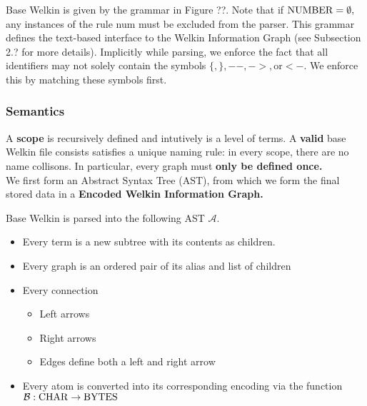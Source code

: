 Base Welkin is given by the grammar in Figure ??. Note that if $\mathrm{NUMBER}= \emptyset,$ any instances of the rule num must be excluded from the parser. This grammar defines the text-based interface to the Welkin Information Graph (see Subsection 2.? for more details). Implicitly while parsing, we enforce the fact that all identifiers may not solely contain the symbols $\{, \}, --, ->, \text{or} <-.$ We enforce this by matching these symbols first.

\subsubsection*{Semantics}
A \textbf{scope} is recursively defined and intutively is a level of terms. A \textbf{valid} base Welkin file consists satisfies a unique naming rule: in every scope, there are no name collisons. In particular, every graph must \textbf{only be defined once.}
\\ We first form an Abstract Syntax Tree (AST), from which we form the final stored data in a \textbf{Encoded Welkin Information Graph.}
\begin{definition}
  Base Welkin is parsed into the following AST $\mathcal{A}.$
  \begin{itemize}
	\item Every term is a new subtree with its contents as children.
    \item Every graph is an ordered pair of its alias and list of children
    \item Every connection
		  \begin{itemize}
			\item Left arrows
			\item Right arrows
			\item Edges define both a left and right arrow
		  \end{itemize}
	\item Every atom is converted into its corresponding encoding via the function $\mathcal{B} : \mathrm{CHAR} \to \mathrm{BYTES}$
\end{itemize}
 \end{definition}
